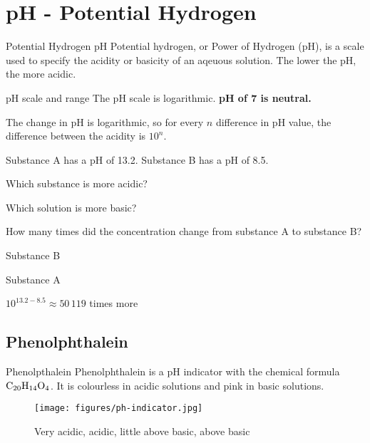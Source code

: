 \documentclass[12pt]{report}
\begin{document}
\newpage
\section{pH - Potential Hydrogen}
\begin{definition}{Potential Hydrogen pH}
   Potential hydrogen, or Power of Hydrogen (pH), is a scale used to specify the acidity or basicity of an aqeuous solution. The lower the pH, the more acidic.   
\end{definition}

\begin{note}{pH scale and range}
    The pH scale is logarithmic. \textbf{pH of 7 is neutral.}  
\end{note}

The change in pH is logarithmic, so for every $n$ difference in pH value, the difference between the acidity is $10^n$. 

\begin{example}{Substance A has a pH of 13.2. Substance B has a pH of 8.5.
        \begin{2qu}
            \item{Which substance is more acidic?}
            \item{Which solution is more basic?}
            \item{How many times did the concentration change from substance A to substance B?}
        \end{2qu}
    }
    \invis
    \begin{2qu}
        \item{Substance B}
        \item{Substance A}
        \item{$10^{13.2-8.5}\approx 50\,119$ times more}
    \end{2qu}
\end{example}

\subsection{Phenolphthalein}
\begin{definition}{Phenolpthalein}
    Phenolphthalein is a pH indicator with the chemical formula $\ce{C20H14O4}$. It is colourless in acidic solutions and pink in basic solutions. 
\end{definition}

\begin{figure}[H]
\centering
    \texttt{[image: figures/ph-indicator.jpg]}
    \caption{Very acidic, acidic, little above basic, above basic}
\end{figure}
\end{document}

